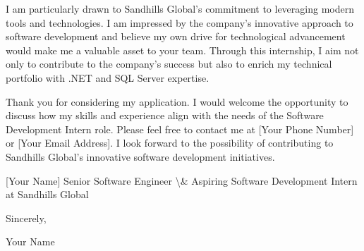 \documentclass[letterpaper,11pt]{article}
\begin{document}
I am particularly drawn to Sandhills Global's commitment to leveraging modern tools and technologies. I am impressed by the company's innovative approach to software development and believe my own drive for technological advancement would make me a valuable asset to your team. Through this internship, I aim not only to contribute to the company's success but also to enrich my technical portfolio with .NET and SQL Server expertise.

Thank you for considering my application. I would welcome the opportunity to discuss how my skills and experience align with the needs of the Software Development Intern role. Please feel free to contact me at [Your Phone Number] or [Your Email Address]. I look forward to the possibility of contributing to Sandhills Global's innovative software development initiatives.

[Your Name]  
Senior Software Engineer \textbackslash{}& Aspiring Software Development Intern at Sandhills Global


\vspace{0.25in}

Sincerely,

\vspace{0.5in}

Your Name
\end{document}
